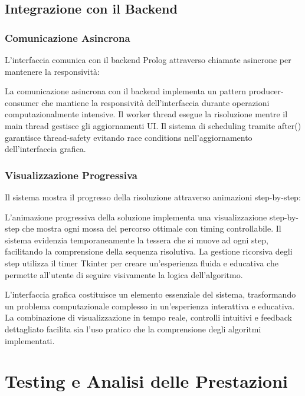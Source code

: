 \documentclass[12pt,a4paper]{report}
\theoremstyle{definition}
\begin{document}
\section{Integrazione con il Backend}

\subsection{Comunicazione Asincrona}

L'interfaccia comunica con il backend Prolog attraverso chiamate asincrone per mantenere la responsività:

La comunicazione asincrona con il backend implementa un pattern producer-consumer che mantiene la responsività dell'interfaccia durante operazioni computazionalmente intensive. Il worker thread esegue la risoluzione mentre il main thread gestisce gli aggiornamenti UI. Il sistema di scheduling tramite after() garantisce thread-safety evitando race conditions nell'aggiornamento dell'interfaccia grafica.

\subsection{Visualizzazione Progressiva}

Il sistema mostra il progresso della risoluzione attraverso animazioni step-by-step:

L'animazione progressiva della soluzione implementa una visualizzazione step-by-step che mostra ogni mossa del percorso ottimale con timing controllabile. Il sistema evidenzia temporaneamente la tessera che si muove ad ogni step, facilitando la comprensione della sequenza risolutiva. La gestione ricorsiva degli step utilizza il timer Tkinter per creare un'esperienza fluida e educativa che permette all'utente di seguire visivamente la logica dell'algoritmo.

L'interfaccia grafica costituisce un elemento essenziale del sistema, trasformando un problema computazionale complesso in un'esperienza interattiva e educativa. La combinazione di visualizzazione in tempo reale, controlli intuitivi e feedback dettagliato facilita sia l'uso pratico che la comprensione degli algoritmi implementati.

\chapter{Testing e Analisi delle Prestazioni}
\end{document}
